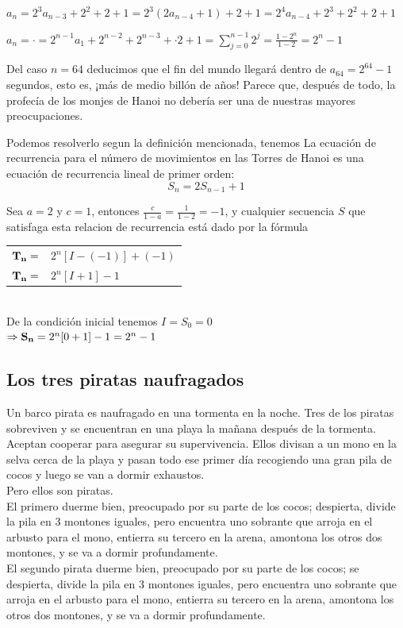 \documentclass{article}
\begin{document}
$a_n = 2^3 a_{n-3} + 2^2 + 2 +1 =2^3 (2a_{n-4}+1)+2+1 = 2^4 a_{n-4} + 2^3+2^2+2+1$

$a_n = \cdot = 2^{n-1}a_1 + 2^{n-2} + 2^{n-3} + \cdot 2 + 1 = \sum_{j=0}^{n-1}2^j = \frac{1-2^n}{1-2} = 2^n - 1$

Del caso $n=64$ deducimos que el fin del mundo llegará dentro de $a_{64}= 2^{64} -1$ segundos, esto es, ¡más de medio billón de años! Parece que, después de todo, la profecía de los monjes de Hanoi no debería ser una de nuestras mayores preocupaciones.

Podemos resolverlo segun la definición mencionada, tenemos
La ecuación de recurrencia para el número de movimientos en las Torres de Hanoi es una ecuación de recurrencia lineal de primer orden:
$$S_n = 2 S_{n-1} + 1$$

Sea $a=2$ y $c=1$, entonces $\frac{c}{1-a} = \frac{1}{1-2} = -1$, y cualquier secuencia $S$ que satisfaga esta relacion de recurrencia está dado por la fórmula\\

\begin{tabular}{cl}
   ${\bf T_{n}} =$  & $2^{n}[I - (-1)] + (-1)$ \\
    ${\bf T_{n}} =$ & $2^{n}[I + 1] - 1$
\end{tabular}\\
De la condición inicial tenemos $I=S_0=0$\\
 $\Rightarrow {\bf S_n} = 2^{n}[0+1] - 1 = 2^n -1$ 


\subsection{Los tres piratas naufragados}

Un barco pirata es naufragado en una tormenta en la noche. Tres de los piratas sobreviven y se encuentran en una playa la mañana después de la tormenta. Aceptan cooperar para asegurar su supervivencia. Ellos divisan a un mono en la selva cerca de la playa y pasan todo ese primer día recogiendo una gran pila de cocos y luego se van a dormir exhaustos.\\
Pero ellos son piratas.\\
El primero duerme bien, preocupado por su parte de los cocos; despierta, divide la pila en 3 montones iguales, pero encuentra uno sobrante que arroja en el arbusto para el mono, entierra su tercero en la arena, amontona los otros dos montones, y se va a dormir profundamente.\\
El segundo pirata duerme bien, preocupado por su parte de los cocos; se despierta, divide la pila en 3 montones iguales, pero encuentra uno sobrante que arroja en el arbusto para el mono, entierra su tercero en la arena, amontona los otros dos montones, y se va a dormir profundamente.\\
\end{document}
